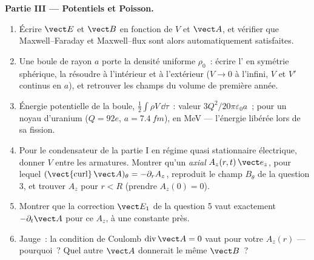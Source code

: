 \begin{problem}
\medskip
\noindent\textbf{Partie III --- Potentiels et Poisson.}
\begin{enumerate}[resume]
  \item Écrire $\vect E$ et $\vect B$ en fonction de $V$ et $\vect A$, et vérifier
        que Maxwell--Faraday et Maxwell--flux sont alors automatiquement
        satisfaites.
  \item Une boule de rayon $a$ porte la densité uniforme $\rho_0$~: écrire
        l' en symétrie sphérique, la résoudre à l'intérieur et à
        l'extérieur ($V \to 0$ à l'infini, $V$ et $V'$ continus en $a$), et
        retrouver les champs du volume de première année.
  \item Énergie potentielle de la boule, $\tfrac12\int\rho V\,\dd\tau$~: valeur
        $3Q^2/20\pi\varepsilon_0a$~; pour un noyau d'uranium ($Q = 92e$, $a =
        \qty{7.4}{fm}$), en MeV --- l'énergie libérée lors de sa fission.
  \item Pour le condensateur de la partie I en régime quasi stationnaire
        électrique, donner $V$ entre les armatures. Montrer qu'un 
        \emph{axial} $A_z(r, t)\,\vect e_z$, pour lequel $(\operatorname{\vect{curl}}
        \vect A)_\theta = -\partial_rA_z$, reproduit le champ $B_\theta$ de
        la question 3, et trouver $A_z$ pour $r < R$ (prendre $A_z(0) = 0$).
  \item Montrer que la correction $\vect E_1$ de la question 5 vaut exactement
        $-\partial_t\vect A$ pour ce $A_z$, à une constante près.
  \item Jauge~: la condition de Coulomb $\operatorname{div}\vect A = 0$ vaut pour
        votre $A_z(r)$ --- pourquoi~? Quel autre $\vect A$ donnerait le même $\vect B$~?
\end{enumerate}


\end{problem}
